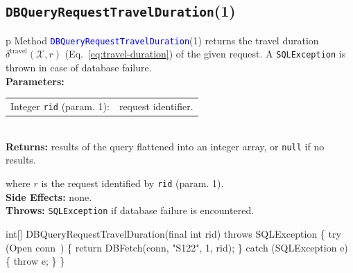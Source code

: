 \subsection{{\tt{}\protect{}DBQueryRequestTravelDuration}(1)}
\begin{tabular}{p{\textwidth}}
\toprule
{}
Method \textcolor{blue}{{\tt{}\protect{}DBQueryRequestTravelDuration}}(1) returns the
travel duration $\delta^\textrm{travel}(\mathcal{X},r)$
(Eq.~\ref{eq:travel-duration}) of the given request.
A {\tt{}SQLException} is thrown in case of database failure.\\
\midrule
\textbf{Parameters:}\\
\begin{tabular}{lp{116mm}}
Integer {\tt{}rid} (param. 1):&request identifier.
\end{tabular}\\
\textbf{Returns:} results of the query flattened into an integer array,
or {\tt{}null} if no results.


where $r$ is the request identified by {\tt{}rid} (param. 1).\\
\textbf{Side Effects:} none.\\
\textbf{Throws:} {\tt{}SQLException} if database failure is encountered.\\
\bottomrule
\end{tabular}
\nwenddocs{}\endmoddef{}
int[] DBQueryRequestTravelDuration(final int rid) throws SQLException \{
  try (\LA{}Open \code{}conn\edoc{}~{\nwtagstyle{}}\RA{}) \{
    return DBFetch(conn, "S122", 1, rid);
  \} catch (SQLException e) \{
    throw e;
  \}
\}
\eatline
{}\nwendcode{}\nwdocspar
